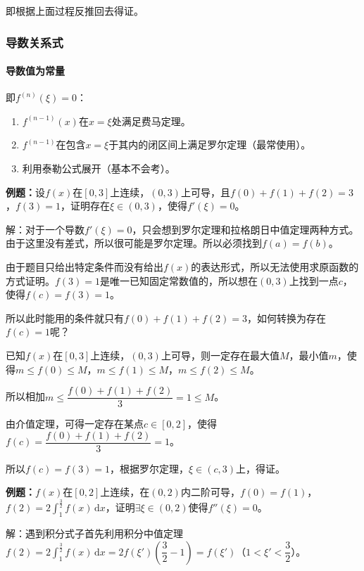 即根据上面过程反推回去得证。

\subsubsection{导数关系式}

\paragraph{导数值为常量} \leavevmode \medskip

即$f^{(n)}(\xi)=0$：

\begin{enumerate}
    \item $f^{(n-1)}(x)$在$x=\xi$处满足费马定理。
    \item $f^{(n-1)}$在包含$x=\xi$于其内的闭区间上满足罗尔定理（最常使用）。
    \item 利用泰勒公式展开（基本不会考）。
\end{enumerate}

\textbf{例题：}设$f(x)$在$[0,3]$上连续，$(0,3)$上可导，且$f(0)+f(1)+f(2)=3$，$f(3)=1$，证明存在$\xi\in(0,3)$，使得$f'(\xi)=0$。

解：对于一个导数$f'(\xi)=0$，只会想到罗尔定理和拉格朗日中值定理两种方式。由于这里没有差式，所以很可能是罗尔定理。所以必须找到$f(a)=f(b)$。

由于题目只给出特定条件而没有给出$f(x)$的表达形式，所以无法使用求原函数的方式证明。$f(3)=1$是唯一已知固定常数值的，所以想在$(0,3)$上找到一点$c$，使得$f(c)=f(3)=1$。

所以此时能用的条件就只有$f(0)+f(1)+f(2)=3$，如何转换为存在$f(c)=1$呢？

已知$f(x)$在$[0,3]$上连续，$(0,3)$上可导，则一定存在最大值$M$，最小值$m$，使得$m\leqslant f(0)\leqslant M$，$m\leqslant f(1)\leqslant M$，$m\leqslant f(2)\leqslant M$。\medskip

所以相加$m\leqslant\dfrac{f(0)+f(1)+f(2)}{3}=1\leqslant M$。

由介值定理，可得一定存在某点$c\in[0,2]$，使得$f(c)=\dfrac{f(0)+f(1)+f(2)}{3}=1$。

所以$f(c)=f(3)=1$，根据罗尔定理，$\xi\in(c,3)$上，得证。

\textbf{例题：}$f(x)$在$[0,2]$上连续，在$(0,2)$内二阶可导，$f(0)=f(1)$，$f(2)=2\int_1^{\frac{3}{2}}f(x)\,\textrm{d}x$，证明$\exists\xi\in(0,2)$使得$f''(\xi)=0$。

解：遇到积分式子首先利用积分中值定理$f(2)=2\int_1^{\frac{3}{2}}f(x)\,\textrm{d}x=2f(\xi')(\dfrac{3}{2}-1)=f(\xi')$（$1<\xi'<\dfrac{3}{2}$）。

